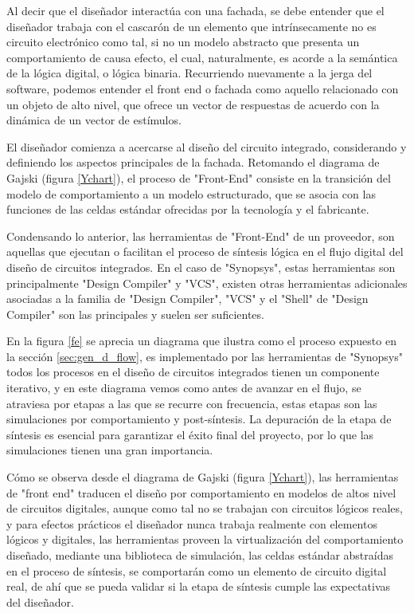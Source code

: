 Al decir que el diseñador interactúa con una fachada, se debe entender que el diseñador trabaja con el cascarón de un elemento que intrínsecamente no es circuito electrónico como tal, si no un modelo abstracto que presenta un comportamiento de causa efecto, el cual, naturalmente, es acorde a la semántica de la lógica digital, o lógica binaria. Recurriendo nuevamente a la jerga del software, podemos entender el front end o fachada como aquello relacionado con un objeto de alto nivel, que ofrece un vector de respuestas de acuerdo con la dinámica de un vector de estímulos.

El diseñador comienza a acercarse al diseño del circuito integrado, considerando y definiendo los aspectos principales de la fachada. Retomando el diagrama de Gajski (figura \ref{Ychart}), el proceso de "Front-End" consiste en la transición del modelo de comportamiento a un modelo estructurado, que se asocia con las funciones de las celdas estándar ofrecidas por la tecnología y el fabricante.

Condensando lo anterior, las herramientas de "Front-End" de un proveedor, son aquellas que ejecutan o facilitan el proceso de síntesis lógica en el flujo digital del diseño de circuitos integrados. En el caso de "Synopsys", estas herramientas son principalmente "Design Compiler" y "VCS", existen otras herramientas adicionales asociadas a la familia de "Design Compiler", "VCS" y el "Shell" de "Design Compiler" son las principales y suelen ser suficientes.

En la figura \ref{fe} se aprecia un diagrama que ilustra como el proceso expuesto en la sección \ref{sec:gen_d_flow}, es implementado por las herramientas de "Synopsys" todos los procesos en el diseño de circuitos integrados tienen un componente iterativo, y en este diagrama vemos como antes de avanzar en el flujo, se atraviesa por etapas a las que se recurre con frecuencia, estas etapas son las simulaciones por comportamiento y post-síntesis. La depuración de la etapa de síntesis es esencial para garantizar el éxito final del proyecto, por lo que las simulaciones tienen una gran importancia.

Cómo se observa desde el diagrama de Gajski (figura \ref{Ychart}), las herramientas de "front end" traducen el diseño por comportamiento en modelos de altos nivel de circuitos digitales, aunque como tal no se trabajan con circuitos lógicos reales, y para efectos prácticos el diseñador nunca trabaja realmente con elementos lógicos y digitales, las herramientas proveen la virtualización del comportamiento diseñado, mediante una biblioteca de simulación, las celdas estándar abstraídas en el proceso de síntesis, se comportarán como un elemento de circuito digital real, de ahí que se pueda validar si la etapa de síntesis cumple las expectativas del diseñador.

